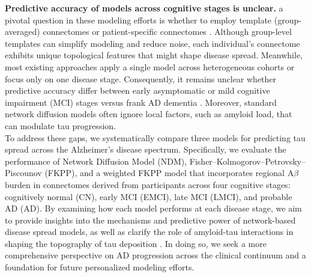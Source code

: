 \textbf{Predictive accuracy of models across cognitive stages is unclear.} a pivotal question in these modeling efforts is whether to employ template (group-averaged) connectomes or patient-specific connectomes \citep{thompsonPredictingSpreadAlzheimers, vasaNullModelsNetwork2022}. Although group-level templates can simplify modeling and reduce noise, each individual’s connectome exhibits unique topological features that might shape disease spread. Meanwhile, most existing approaches apply a single model across heterogeneous cohorts or focus only on one disease stage. Consequently, it remains unclear whether predictive accuracy differ between early asymptomatic or mild cognitive impairment (MCI) stages versus frank AD dementia \citep{heCoupledmechanismsModellingFramework2023}. Moreover, standard network diffusion models often ignore local factors, such as amyloid load, that can modulate tau progression.\\

To address these gaps, we systematically compare three models for predicting tau spread across the Alzheimer’s disease spectrum. Specifically, we evaluate the performance of Network Diffusion Model (NDM), Fisher--Kolmogorov--Petrovsky--Piscounov (FKPP), and a weighted FKPP model that incorporates regional A$\beta$ burden in connectomes derived from participants across four cognitive stages: cognitively normal (CN), early MCI (EMCI), late MCI (LMCI), and probable AD (AD). By examining how each model performs at each disease stage, we aim to provide insights into the mechanisms and predictive power of network-based disease spread models, as well as clarify the role of amyloid-tau interactions in shaping the topography of tau deposition \citep{thompsonDemonstrationOpensourceToolbox2024}. In doing so, we seek a more comprehensive perspective on AD progression across the clinical continuum and a foundation for future personalized modeling efforts.



